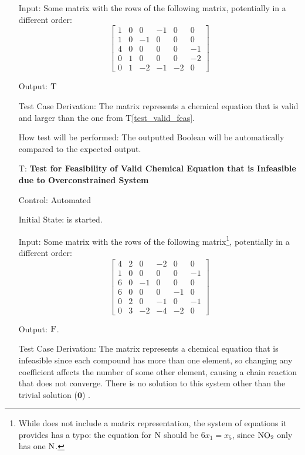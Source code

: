 \documentclass[12pt, titlepage]{article}
\newcounter{testnum} %
\newcommand{\testref}[1]{T\ref{#1}}
\begin{document}
\begin{enumerate}
    Input: Some matrix with the rows of the following matrix, potentially in a
    different order:
    $$\begin{bmatrix}
        1 & 0 & 0  & -1 & 0  & 0  \\
        1 & 0 & -1 & 0  & 0  & 0  \\
        4 & 0 & 0  & 0  & 0  & -1 \\
        0 & 1 & 0  & 0  & 0  & -2 \\
        0 & 1 & -2 & -1 & -2 & 0
      \end{bmatrix}$$

    Output: $\textsc{T}$

    Test Case Derivation: The matrix represents a chemical equation that is
    valid and larger than the one from \testref{test_valid_feas}.

    How test will be performed: The outputted Boolean will be automatically
    compared to the expected output.

  \item[T\refstepcounter{testnum}\thetestnum \label{test_over_valid_inf}:]
    \textbf{Test for Feasibility of Valid Chemical Equation that is Infeasible
      due to Overconstrained System}

    Control: Automated

    Initial State: \progname{} is started.

    Input: Some matrix with the rows of the following matrix\footnote{While
      \cite{hamid_balancing_2019} does not include a matrix representation, the
      system of equations it provides has a typo: the equation for $\ce{N}$
      should be $6x_1 = x_5$, since $\ce{NO2}$ only has one $\ce{N}$.},
    potentially in a different order:
    $$\begin{bmatrix}
        4 & 2 & 0  & -2 & 0  & 0  \\
        1 & 0 & 0  & 0  & 0  & -1 \\
        6 & 0 & -1 & 0  & 0  & 0  \\
        6 & 0 & 0  & 0  & -1 & 0  \\
        0 & 2 & 0  & -1 & 0  & -1 \\
        0 & 3 & -2 & -4 & -2 & 0
      \end{bmatrix}$$

    Output: $\textsc{F}$.

    Test Case Derivation: The matrix represents a chemical equation that is
    infeasible since
    each compound has more than one element, so changing any coefficient
    affects the number of some other element, causing a chain reaction that
    does not converge. There is no solution to this system other than the
    trivial solution ($\mathbf{0}$) \cite{hamid_balancing_2019}.


\end{enumerate}
\end{document}

